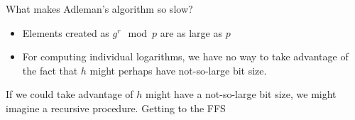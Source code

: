 \documentclass[11pt]{article}
\begin{document}
What makes Adleman's algorithm so slow?

\begin{itemize}
	\item Elements created as $g^r \mod p$ are as large as $p$
	\item For computing individual logarithms, we have no way to take advantage of the fact that $h$ might perhaps have not-so-large bit size.
\end{itemize}

If we could take advantage of $h$ might have a not-so-large bit size, we might imagine a recursive procedure. Getting to the FFS
\end{document}
